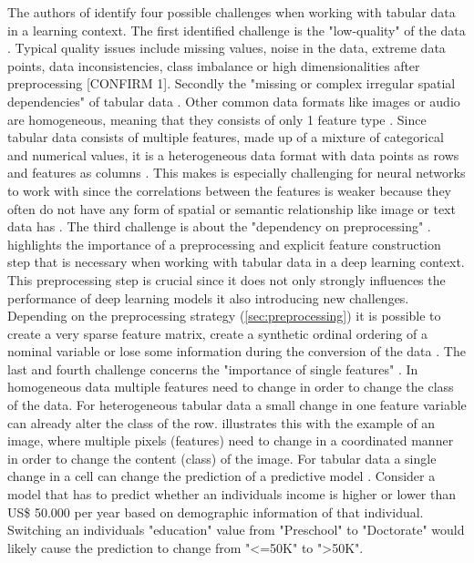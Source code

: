 The authors of \cite{borisov2022DeepNeuralNetworks} identify four possible challenges when working with tabular data in a learning context.
The first identified challenge is the "low-quality" of the data \cite[p. 4]{borisov2022DeepNeuralNetworks}. 
Typical quality issues include missing values, noise in the data, extreme data points, data inconsistencies, class imbalance or high dimensionalities after preprocessing \cite{borisov2022DeepNeuralNetworks}[CONFIRM 1].
Secondly the "missing or complex irregular spatial dependencies" of tabular data \cite[p. 4]{borisov2022DeepNeuralNetworks}. 
Other common data formats like images or audio are homogeneous, 
meaning that they consists of only 1 feature type \cite{borisov2022DeepNeuralNetworks}.
Since tabular data consists of multiple features, made up of a mixture of categorical and numerical values, it is a heterogeneous data format with data points as rows and features as columns \cite{borisov2022DeepNeuralNetworks}.
This makes is especially challenging for neural networks to work with since the correlations between the features is weaker because they often do not have any form of spatial or semantic relationship like image or text data has \cite{borisov2022DeepNeuralNetworks, yoon2020VIMEExtendingSuccess}.
The third challenge is about the "dependency on preprocessing" \cite[p. 4]{borisov2022DeepNeuralNetworks}. 
\cite{borisov2022DeepNeuralNetworks} highlights the importance of a preprocessing and explicit feature construction step that is necessary when working with tabular data in a deep learning context.
This preprocessing step is crucial since it does not only strongly influences the performance of deep learning \glspl{model} \cite{gorishniy2022EmbeddingsNumericalFeatures} 
it also introducing new challenges. 
Depending on the preprocessing strategy (\autoref{sec:preprocessing}) it is possible to create a very sparse feature matrix, create a synthetic ordinal ordering of a nominal variable or lose some information during the conversion of the data \cite{borisov2022DeepNeuralNetworks}.
The last and fourth challenge concerns the "importance of single features" \cite[p. 4]{borisov2022DeepNeuralNetworks}. 
In homogeneous data multiple features need to change in order to change the class of the data. 
For heterogeneous tabular data a small change in one feature variable can already alter the class of the row. 
\cite{borisov2022DeepNeuralNetworks} illustrates this with the example of an image, where multiple pixels (\ie features) need to change in a coordinated manner in order to change the content (\ie class) of the image.
For tabular data a single change in a cell can change the prediction of a predictive \gls{model} \cite{borisov2022DeepNeuralNetworks}. 
Consider a \gls{model} that has to predict whether an individuals income is higher or lower than US\$ 50.000 per year \cite{Dua:2019} based on demographic information of that individual.
Switching an individuals "education" value from "Preschool" to "Doctorate" would likely cause the prediction to change from "<=50K" to ">50K".



